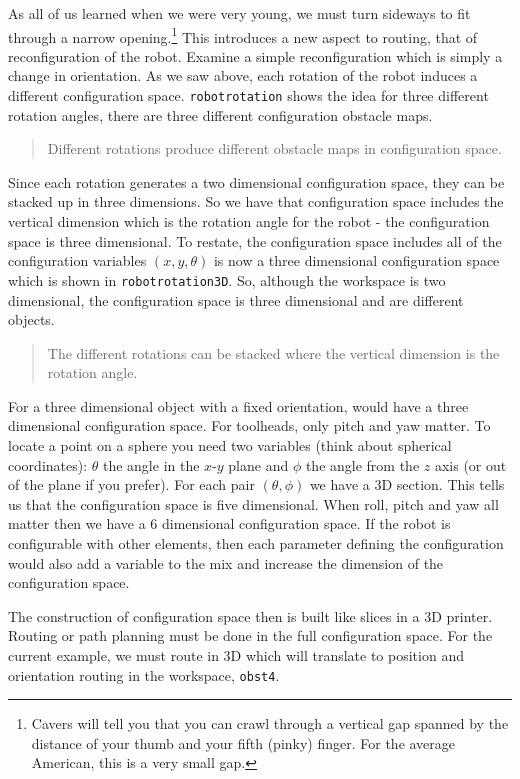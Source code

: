 As all of us learned when we were very young, we must turn sideways to
fit through a narrow opening.\footnote{Cavers will tell you that you can
  crawl through a vertical gap spanned by the distance of your thumb and
  your fifth (pinky) finger. For the average American, this is a very
  small gap.} This introduces a new aspect to routing, that of
reconfiguration of the robot. Examine a simple reconfiguration which is
simply a change in orientation. As we saw above, each rotation of the
robot induces a different configuration space. \texttt{robotrotation}
shows the idea for three different rotation angles, there are three
different configuration obstacle maps.

\begin{quote}
Different rotations produce different obstacle maps in configuration
space.
\end{quote}

Since each rotation generates a two dimensional configuration space,
they can be stacked up in three dimensions. So we have that
configuration space includes the vertical dimension which is the
rotation angle for the robot - the configuration space is three
dimensional. To restate, the configuration space includes all of the
configuration variables \((x,y, \theta)\) is now a three dimensional
configuration space which is shown in \texttt{robotrotation3D}. So,
although the workspace is two dimensional, the configuration space is
three dimensional and are different objects.

\begin{quote}
The different rotations can be stacked where the vertical dimension is
the rotation angle.
\end{quote}

For a three dimensional object with a fixed orientation, would have a
three dimensional configuration space. For toolheads, only pitch and yaw
matter. To locate a point on a sphere you need two variables (think
about spherical coordinates): \(\theta\) the angle in the \(x\)-\(y\)
plane and \(\phi\) the angle from the \(z\) axis (or out of the plane if
you prefer). For each pair \((\theta, \phi)\) we have a 3D section. This
tells us that the configuration space is five dimensional. When roll,
pitch and yaw all matter then we have a 6 dimensional configuration
space. If the robot is configurable with other elements, then each
parameter defining the configuration would also add a variable to the
mix and increase the dimension of the configuration space.

The construction of configuration space then is built like slices in a
3D printer. Routing or path planning must be done in the full
configuration space. For the current example, we must route in 3D which
will translate to position and orientation routing in the workspace,
\texttt{obst4}.

